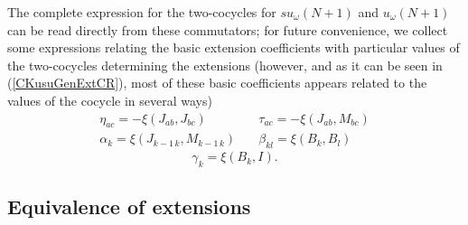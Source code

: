 \documentclass[12pt]{article}
\begin{document}
The complete expression for the two-cocycles for ${su}_{\omega}(N+1)$ and
${u}_{\omega}(N+1)$ can be read directly
from these commutators; for future convenience, we collect some
expressions relating the basic extension coefficients with
particular values of the two-cocycles determining the extensions
(however, and as it can be seen in (\ref{CKusuGenExtCR}), most of
these basic coefficients appears related to the values of the
cocycle in several ways)
\begin{equation}
\begin{array}{ll}
{\eta}_{ac} = -{\xi}({J}_{ab}, {J}_{bc})  & \quad
  {\tau}_{ac} = -{\xi}({J}_{ab},  {M}_{bc}) \\
{\alpha}_{k} = {\xi}({J}_{k-1\,k}, {M}_{k-1\, k}) & \quad
  {\beta}_{kl} = {\xi}({B}_{k}, {B}_{l})
\end{array}
\label{suBasicExtCoef}
\end{equation}
\begin{equation}
 {\gamma}_k = {\xi}({B}_k, {I}).
\label{suBasicExtCoefb}
\end{equation}

\subsection{Equivalence of extensions}
\end{document}
